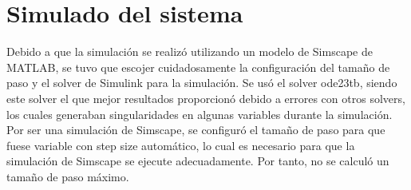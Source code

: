\section{Simulado del sistema}
Debido a que la simulación se realizó utilizando un modelo de Simscape de MATLAB,
se tuvo que escojer cuidadosamente la configuración del tamaño de paso y el solver
de Simulink para la simulación.
Se usó el solver ode23tb, siendo este solver el que mejor resultados proporcionó debido 
a errores con otros solvers, los cuales generaban singularidades en algunas variables durante la 
simulación.
Por ser una simulación de Simscape, se configuró el tamaño de paso para que fuese 
variable con step size automático, lo cual es necesario para que la simulación de 
Simscape se ejecute adecuadamente.
Por tanto, no se calculó un tamaño de paso máximo.

